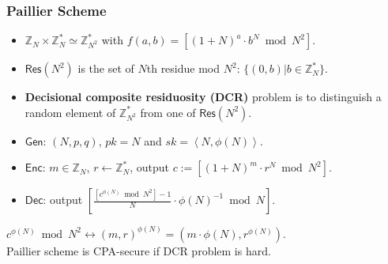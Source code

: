 \begin{frame}\frametitle{Paillier Scheme}
\begin{itemize}
\item $\mathbb{Z}_N\times \mathbb{Z}_N^* \simeq \mathbb{Z}_{N^2}^*$ with $f(a,b)=[(1+N)^a\cdot b^N \bmod N^2]$.
\item $\mathsf{Res}(N^2)$ is the set of $N$th residue mod $N^2$: $\{(0,b) | b \in \mathbb{Z}_N^*\}$.
\item \textbf{Decisional composite residuosity (DCR)} problem is to distinguish a random element of $\mathbb{Z}_{N^2}^*$ from one of $\mathsf{Res}(N^2)$. 
\end{itemize}
\begin{construction}
\begin{itemize}
\item $\mathsf{Gen}$: $(N,p,q)$, $pk = N$ and $sk=\left<N,\phi(N)\right>$.
\item $\mathsf{Enc}$: $m\in \mathbb{Z}_N$, $r\gets \mathbb{Z}_N^*$, output $c := [(1+N)^m\cdot r^N \bmod N^2]$.
\item $\mathsf{Dec}$: output $\left[ \frac{[c^{\phi(N)} \bmod N^2]-1}{N}\cdot \phi(N)^{-1} \bmod N\right]$.
\end{itemize}
\end{construction}
$c^{\phi(N)} \bmod N^2 \leftrightarrow (m,r)^{\phi(N)} = (m\cdot {\phi(N)}, r^{\phi(N)}).$ \\
Paillier scheme is CPA-secure if DCR problem is hard.
\end{frame}


